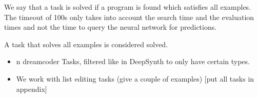 We say that a task is solved if a program is found which satisfies all examples. The timeout of 100s only takes into account the search time and the evaluation times and not the time to query the neural network for predictions.

A task that solves all examples is considered solved.
\begin{itemize}
    \item n dreamcoder Tasks, filtered like in DeepSynth to only have certain types.
    \item We work with list editing tasks (give a couple of examples) [put all tasks in appendix]
\end{itemize}














































